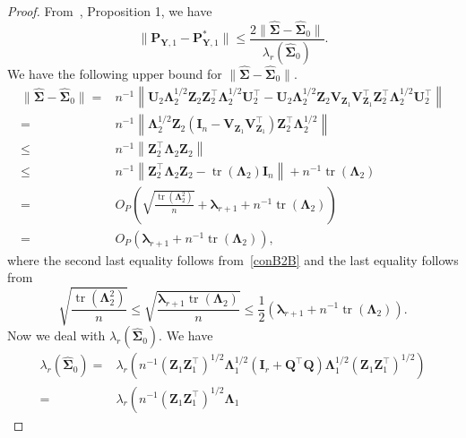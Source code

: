 \documentclass[10pt]{book}
\theoremstyle{definition}
\DeclareMathOperator{\mytr}{tr}
\newcommand{\bQ}{\mathbf{Q}}
\newcommand{\bZ}{\mathbf{Z}}
\newcommand{\bP}{\mathbf{P}}
\newcommand{\bY}{\mathbf{Y}}
\newcommand{\bI}{\mathbf{I}}
\newcommand{\bU}{\mathbf{U}}
\newcommand{\bV}{\mathbf{V}}
\newcommand{\bfsym}[1]{\ensuremath{\boldsymbol{#1}}}
\def\blambda {\bfsym {\lambda}}
\def\bLambda {\bfsym {\Lambda}}
\def\bSigma {\bfsym {\Sigma}}
\begin{document}
\begin{proof}
    From~\cite{Cai2015Optimal}, Proposition 1, we have
    \begin{equation}\label{asd1}
        \|\bP_{\bY,1} -\bP_{\bY,1}^* \|
        \leq 
        \frac{2\|\hat{\bSigma}-\hat{\bSigma}_0\|}{\lambda_r(\hat{\bSigma}_0)}.
    \end{equation}
    We have the following upper bound for $\|\hat{\bSigma}-\hat{\bSigma}_0\|$.
    \begin{equation}\label{asd2}
        \begin{split}
            \|\hat{\bSigma}-\hat{\bSigma}_0\|
            =&
    n^{-1}\left\|\bU_2 \bLambda_2^{1/2} \bZ_2  
    \bZ_2^\top \bLambda_2^{1/2}\bU_2^\top
    -\bU_2 \bLambda_2^{1/2} \bZ_2 
    \bV_{\bZ_1}
    \bV_{\bZ_1}^\top
    \bZ_2^\top \bLambda_2^{1/2}\bU_2^\top
    \right\|
    \\
     =&
    n^{-1}\left\|
     \bLambda_2^{1/2} \bZ_2 
    (\bI_n-\bV_{\bZ_1}
    \bV_{\bZ_1}^\top)
    \bZ_2^\top \bLambda_2^{1/2}
    \right\|
    \\
    \leq &
    n^{-1}\left\|\bZ_2^\top \bLambda_2 \bZ_2\right\|
    \\
 \leq& 
     n^{-1}\left\| \bZ_2^\top \bLambda_2\bZ_2-\mytr(\bLambda_2)\bI_n\right\|
     +n^{-1}
     \mytr(\bLambda_2)
     \\
     =&O_P\left( 
\sqrt{\frac{\mytr\left(\bLambda_2^2\right)}{n}}+\blambda_{r+1}
     +
     n^{-1}\mytr(\bLambda_2)
 \right)
 \\
     =&O_P\left( 
\blambda_{r+1}
     +
     n^{-1}\mytr(\bLambda_2)
 \right)
 ,
    \end{split}
\end{equation}
where
the second last equality follows from~\eqref{conB2B} and the last equality follows from
\begin{equation*}
    \sqrt{\frac{\mytr\left(\bLambda_2^2\right)}{n}}
    \leq
    \sqrt{\frac{\blambda_{r+1}\mytr\left(\bLambda_2\right)}{n}}
    \leq
    \frac{1}{2}\left(\blambda_{r+1}+n^{-1}\mytr\left(\bLambda_2\right)\right).
\end{equation*}
Now we deal with $\lambda_r(\hat{\bSigma}_0)$.
We have
\begin{equation*}
    \begin{split}
     \lambda_r(\hat{\bSigma}_0)
     =&\lambda_r\left(
n^{-1}
  (\bZ_1\bZ_1^\top)^{1/2}\bLambda_1^{1/2}(\bI_r +\bQ^\top \bQ)\bLambda_1^{1/2} (\bZ_1\bZ_1^\top)^{1/2}
     \right)
     \\
     =&
     \lambda_r\left(
        n^{-1} (\bZ_1\bZ_1^\top)^{1/2}
         \bLambda_1 

\end{split}
\end{equation*}
\end{proof}
\end{document}
